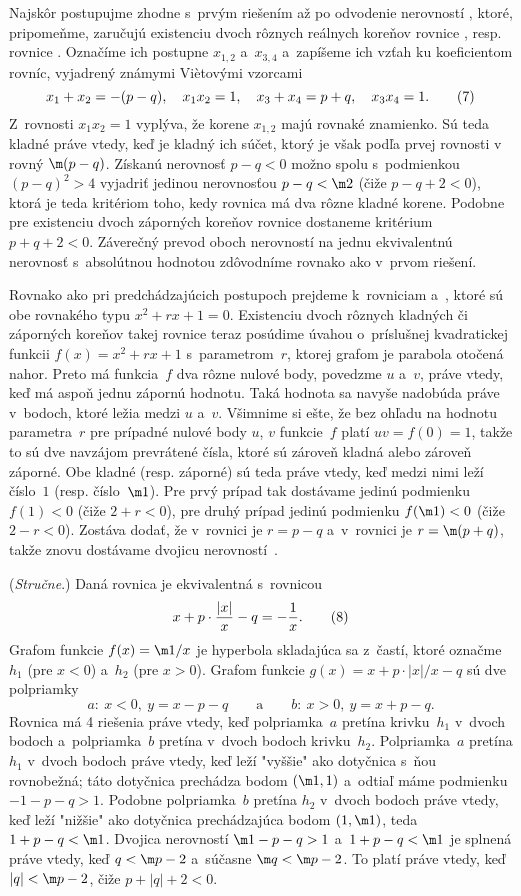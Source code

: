 {\ineriesenie
Najskôr postupujme zhodne s~prvým riešením až po odvodenie
nerovností , ktoré, pripomeňme, zaručujú existenciu
dvoch rôznych reálnych koreňov rovnice , resp. rovnice . Označíme ich
postupne $x_{1,2}$ a~$x_{3,4}$ a~zapíšeme ich vzťah ku
koeficientom rovníc, vyjadrený známymi Vi\`etovými vzorcami
$$
x_1+x_2=-(p-q),\quad x_1x_2=1,\quad x_3+x_4=p+q,\quad x_3x_4=1.
\tag7
$$
Z~rovnosti $x_1x_2=1$ vyplýva, že korene $x_{1,2}$ majú rovnaké znamienko.
Sú teda kladné práve vtedy, keď je kladný ich súčet, ktorý je však
podľa prvej rovnosti v~ rovný $\m(p-q)$. Získanú nerovnosť
$p-q<0$ možno spolu s~podmienkou $(p-q)^2>4$
vyjadriť jedinou nerovnosťou $p-q<\m2$ (čiže $p-q+2<0$), ktorá
je teda kritériom toho, kedy rovnica  má dva rôzne kladné korene.
Podobne pre existenciu dvoch záporných koreňov rovnice  dostaneme
kritérium $p+q+2<0$. Záverečný prevod oboch nerovností na jednu
ekvivalentnú nerovnosť s~absolútnou hodnotou
zdôvodníme rovnako ako v~prvom riešení.

\ineriesenie
Rovnako ako pri predchádzajúcich postupoch prejdeme k~rovniciam 
a~, ktoré sú obe rovnakého typu $x^2+rx+1=0$. Existenciu dvoch
rôznych kladných či záporných koreňov takej rovnice
teraz posúdime úvahou o~príslušnej kvadratickej funkcii $f(x)=x^2+rx+1$
s~parametrom~$r$, ktorej grafom je parabola otočená nahor.
Preto má funkcia~$f$ dva rôzne nulové body, povedzme $u$ a~$v$,
práve vtedy, keď má aspoň jednu zápornú hodnotu. Taká
hodnota sa navyše nadobúda práve v~bodoch, ktoré ležia medzi $u$ a~$v$.
Všimnime si ešte, že bez ohľadu na hodnotu parametra~$r$ pre prípadné nulové body $u$, $v$ funkcie~$f$ platí $uv=f(0)=1$,
takže to sú dve navzájom prevrátené čísla, ktoré sú zároveň
kladná alebo zároveň záporné. Obe kladné (resp. záporné) sú teda
práve vtedy, keď medzi nimi leží číslo~$1$ (resp. číslo~$\m1$).
Pre prvý prípad tak dostávame jedinú podmienku $f(1)<0$
(čiže $2+r<0$), pre druhý prípad jedinú podmienku $f(\m1)<0$
(čiže $2-r<0$). Zostáva dodať, že v~rovnici  je $r=p-q$
a~v~rovnici  je $r=\m(p+q)$, takže znovu dostávame dvojicu
nerovností~.

\ineriesenie
({\it Stručne}.)
Daná rovnica je ekvivalentná s~rovnicou
$$
x+p\cdot \frac{|x|}x-q=-\frac1x.
\tag8
$$
Grafom funkcie $f(x)=\m1/x$ je hyperbola skladajúca sa z~častí, ktoré označme $h_1$ (pre $x<0$) a~$h_2$ (pre $x>0$). Grafom funkcie $g(x)=x+p\cdot {|x|}/x-q$ sú dve polpriamky
$$
a\colon\ x<0,\ y=x-p-q\qquad\text{a}\qquad b\colon\ x>0,\ y=x+p-q.
$$
Rovnica  má 4 riešenia práve vtedy, keď polpriamka~$a$ pretína krivku~$h_1$ v~dvoch bodoch a~polpriamka~$b$ pretína v~dvoch bodoch krivku~$h_2$. Polpriamka~$a$ pretína $h_1$ v~dvoch bodoch práve vtedy, keď leží "vyššie" ako dotyčnica s~ňou rovnobežná; táto dotyčnica prechádza bodom $(\m1,1)$ a~odtiaľ máme podmienku $-1-p-q>1$. Podobne polpriamka~$b$ pretína $h_2$ v~dvoch bodoch práve vtedy, keď leží "nižšie" ako dotyčnica prechádzajúca bodom $(1,\m1)$, teda $1+p-q<\m1$. Dvojica nerovností $\m1-p-q>1$  a~$1+p-q<\m1$ je splnená práve vtedy, keď
$q<\m p-2$ a~súčasne $\m q<\m p-2$. To platí práve vtedy, keď $|q|<\m p-2$, čiže $p+|q|+2<0$.


}
